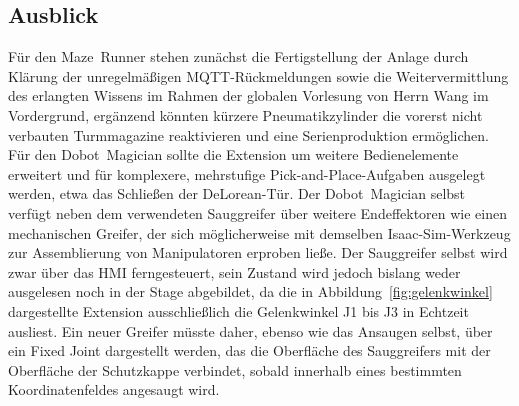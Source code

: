 \documentclass[conference]{IEEEtran}
\begin{document}
\subsection{Ausblick}
Für den Maze~Runner stehen zunächst die Fertigstellung der Anlage durch Klärung der unregelmäßigen MQTT-Rückmeldungen sowie die Weitervermittlung des erlangten Wissens im Rahmen der globalen Vorlesung von Herrn Wang im Vordergrund, ergänzend könnten kürzere Pneumatikzylinder die vorerst nicht verbauten Turmmagazine reaktivieren und eine Serienproduktion ermöglichen.
Für den Dobot~Magician sollte die Extension um weitere Bedienelemente erweitert und für komplexere, mehrstufige Pick-and-Place-Aufgaben ausgelegt werden, etwa das Schließen der DeLorean-Tür.
Der Dobot~Magician selbst verfügt neben dem verwendeten Sauggreifer über weitere Endeffektoren wie einen mechanischen Greifer, der sich möglicherweise mit demselben Isaac-Sim-Werkzeug zur Assemblierung von Manipulatoren erproben ließe.
Der Sauggreifer selbst wird zwar über das HMI ferngesteuert, sein Zustand wird jedoch bislang weder ausgelesen noch in der Stage abgebildet, da die in Abbildung~\ref{fig:gelenkwinkel} dargestellte Extension ausschließlich die Gelenkwinkel J1 bis J3 in Echtzeit ausliest.
Ein neuer Greifer müsste daher, ebenso wie das Ansaugen selbst, über ein Fixed Joint dargestellt werden, das die Oberfläche des Sauggreifers mit der Oberfläche der Schutzkappe verbindet, sobald innerhalb eines bestimmten Koordinatenfeldes angesaugt wird.
\end{document}
